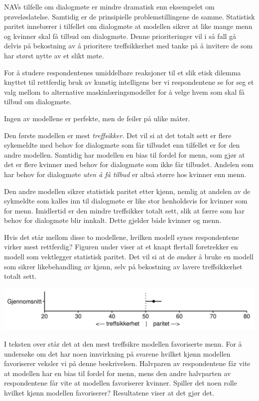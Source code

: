 \documentclass[
]{book}
\begin{document}
NAVs tilfelle om dialogmøte er mindre dramatisk enn eksempelet om prøveløslatelse.
Samtidig er de prinsipielle problemstillingene de samme.
Statistisk paritet innebærer i tilfellet om dialogmøte at modellen sikrer at like mange menn og kvinner skal få tilbud om dialogmøte.
Denne prioriteringer vil i så fall gå delvis på bekostning av å prioritere treffsikkerhet med tanke på å invitere de som har størst nytte av et slikt møte.

For å studere respondentenes umiddelbare reaksjoner til et slik etisk dilemma knyttet til rettferdig bruk av kunstig intelligens ber vi respondentene se for seg et valg mellom to alternative maskinlæringsmodeller for å velge hvem som skal få tilbud om dialogmøte.

Ingen av modellene er perfekte, men de feiler på ulike måter.

Den første modellen er mest \emph{treffsikker}.
Det vil si at det totalt sett er flere sykemeldte med behov for dialogmøte som får tilbudet enn tilfellet er for den andre modellen.
Samtidig har modellen en bias til fordel for menn, som gjør at det er flere kvinner med behov for dialogmøte som ikke får tilbudet.
Andelen som har behov for dialogmøte \emph{uten å få tilbud} er altså større hos kvinner enn menn.

Den andre modellen sikrer statistisk paritet etter kjønn, nemlig at andelen av de sykmeldte som kalles inn til dialogmøte er like stor henholdsvis for kvinner som for menn.
Imidlertid er den mindre treffsikker totalt sett, slik at færre som har behov for dialogmøte blir innkalt.
Dette gjelder både kvinner og menn.

Hvis det står mellom disse to modellene, hvilken modell synes respondentene virker mest rettferdig?
Figuren under viser at et knapt flertall foretrekker en modell som vektlegger statistisk paritet.
Det vil si at de ønsker å bruke en modell som sikrer likebehandling av kjønn, selv på bekostning av lavere treffsikkerhet totalt sett.

\includegraphics{figs/png/fig_parity_avg.png}

I teksten over står det at den mest treffsikre modellen favoriserte menn.
For å undersøke om det har noen innvirkning på svarene hvilket kjønn modellen favoriserer veksler vi på denne beskrivelsen.
Halvparen av respondentene får vite at modellen har en bias til fordel for menn, mens den andre halvparten av respondentene får vite at modellen favoriserer kvinner.
Spiller det noen rolle hvilket kjønn modellen favoriserer?
Resultatene viser at det gjør det.
\end{document}
